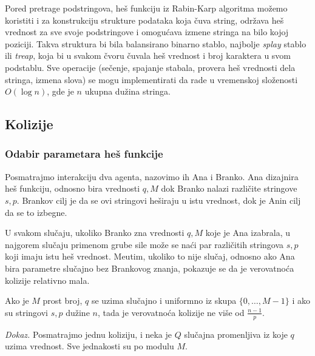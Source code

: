 \noindent
\begin{minipage}[l]{\textwidth}

\end{minipage}

Pored pretrage podstringova, he\v s funkciju iz Rabin-Karp algoritma mo\v zemo koristiti i za konstrukciju strukture podataka koja \v cuva string, odr\v zava he\v s vrednost za sve svoje podstringove i omogu\' cava izmene stringa na bilo kojoj poziciji. Takva struktura bi bila balansirano binarno stablo, najbolje \textit{splay} stablo ili \textit{treap}, koja bi u svakom \v cvoru \v cuvala he\v s vrednost i broj karaktera u svom podstablu. Sve operacije (se\v cenje, spajanje stabala, provera he\v s vrednosti dela stringa, izmena slova) se mogu implementirati da rade u vremenskoj slo\v zenosti $O(\log n)$, gde je $n$ ukupna du\v zina stringa. 

\subsection{Kolizije}

\subsubsection{Odabir parametara he\v s funkcije}

Posmatrajmo interakciju dva agenta, nazovimo ih Ana i Branko. Ana dizajnira he\v s funkciju, odnosno bira vrednosti $q, M$ dok Branko nalazi razli\v cite stringove $s,p$. Brankov cilj je da se ovi stringovi he\v siraju u istu vrednost, dok je Anin cilj da se to izbegne.

U svakom slu\v caju, ukoliko Branko zna vrednosti $q,M$ koje je Ana izabrala, u najgorem slu\v caju primenom grube sile mo\v ze se na\' ci par razli\v citih stringova $s,p$ koji imaju istu he\v s vrednost. Me\dj utim, ukoliko to nije slu\v caj, odnosno ako Ana bira parametre slu\v cajno bez Brankovog znanja, pokazuje se da je verovatno\' ca kolizije relativno mala.

\begin{thm}
    Ako je $M$ prost broj, $q$ se uzima slu\v cajno i uniformno iz skupa $\{0, \ldots, M-1\}$ i ako su stringovi $s,p$ du\v zine $n$, tada je verovatno\' ca kolizije ne vi\v se od $\frac{n-1}{p}$.
\end{thm}

\textit{Dokaz.} Posmatrajmo jednu koliziju, i neka je $Q$ slu\v cajna promenljiva iz koje $q$ uzima vrednost. Sve jednakosti su po modulu $M$.

